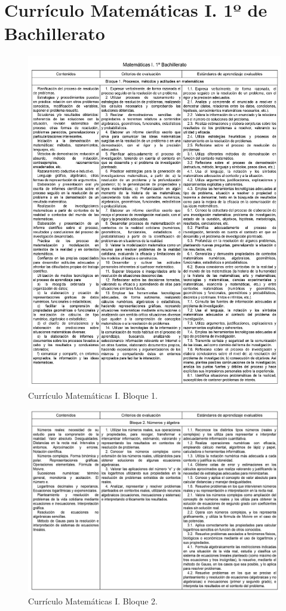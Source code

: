 \documentclass[a4paper, openright, 11pt, titlepage]{report}
\theoremstyle{definition}\newtheorem{defin}[propo]{Definition}
\theoremstyle{definition}\newtheorem{obser}[propo]{Remark}
\theoremstyle{definition}\newtheorem{ejem}[propo]{Ejemplo}
\theoremstyle{definition}\newtheorem{algoritmo}[propo]{Algoritmo}
\begin{document}
\chapter{Currículo Matemáticas I. 1º de Bachillerato}
 \begin{figure}[H]
     \centering
     \includegraphics[width = 1.1\textwidth]{curriculo1.png}
     \caption{Currículo Matemáticas I. Bloque 1.}
 \end{figure}
  \begin{figure}[H]
     \centering
     \includegraphics[width = 1.1\textwidth]{curriculo2.png}
     \caption{Currículo Matemáticas I. Bloque 2.}
 \end{figure}
\end{document}
